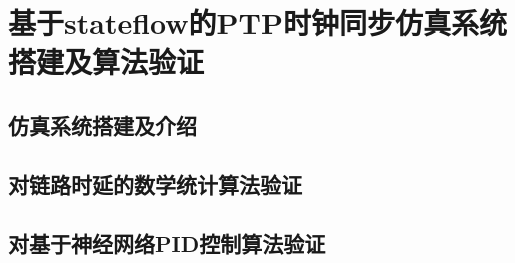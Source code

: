
\chapter{基于stateflow的PTP时钟同步仿真系统搭建及算法验证}

\section{仿真系统搭建及介绍}

\section{对链路时延的数学统计算法验证}

\section{对基于神经网络PID控制算法验证}
